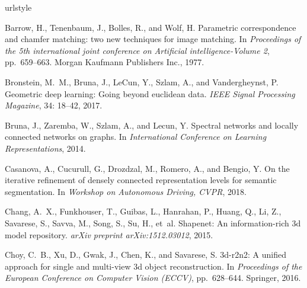\documentclass{article}
\begin{document}

\begin{thebibliography}{59}
\providecommand{\natexlab}[1]{#1}
\providecommand{\url}[1]{\texttt{#1}}
\expandafter\ifx\csname urlstyle\endcsname\relax
  \providecommand{\doi}[1]{doi: #1}\else
  \providecommand{\doi}{doi: \begingroup \urlstyle{rm}\Url}\fi

Barrow, H., Tenenbaum, J., Bolles, R., and Wolf, H.
\newblock Parametric correspondence and chamfer matching: two new techniques
  for image matching.
\newblock In \emph{Proceedings of the 5th international joint conference on
  Artificial intelligence-Volume 2}, pp.\  659--663. Morgan Kaufmann Publishers
  Inc., 1977.

Bronstein, M.~M., Bruna, J., LeCun, Y., Szlam, A., and Vandergheynst, P.
\newblock Geometric deep learning: Going beyond euclidean data.
\newblock \emph{IEEE Signal Processing Magazine}, 34: 18--42, 2017.

Bruna, J., Zaremba, W., Szlam, A., and Lecun, Y.
\newblock Spectral networks and locally connected networks on graphs.
\newblock In \emph{International Conference on Learning Representations}, 2014.

Casanova, A., Cucurull, G., Drozdzal, M., Romero, A., and Bengio, Y.
\newblock On the iterative refinement of densely connected representation
  levels for semantic segmentation.
\newblock In \emph{Workshop on Autonomous Driving, CVPR}, 2018.

Chang, A.~X., Funkhouser, T., Guibas, L., Hanrahan, P., Huang, Q., Li, Z.,
  Savarese, S., Savva, M., Song, S., Su, H., et~al.
\newblock Shapenet: An information-rich 3d model repository.
\newblock \emph{arXiv preprint arXiv:1512.03012}, 2015.

Choy, C.~B., Xu, D., Gwak, J., Chen, K., and Savarese, S.
\newblock 3d-r2n2: A unified approach for single and multi-view 3d object
  reconstruction.
\newblock In \emph{Proceedings of the European Conference on Computer Vision
  (ECCV)}, pp.\  628--644. Springer, 2016.


\end{thebibliography}
\end{document}
